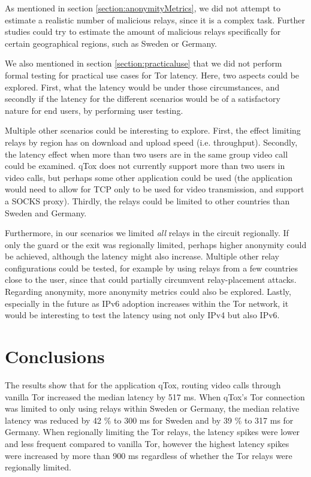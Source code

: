 \documentclass{kththesis}
\begin{document}
As mentioned in section \ref{section:anonymityMetrics}, we did not attempt to estimate a realistic number of malicious relays, since it is a complex task. Further studies could try to estimate the amount of malicious relays specifically for certain geographical regions, such as Sweden or Germany.

We also mentioned in section \ref{section:practicaluse} that we did not perform formal testing for practical use cases for Tor latency. Here, two aspects could be explored. First, what the latency would be under those circumstances, and secondly if the latency for the different scenarios would be of a satisfactory nature for end users, by performing user testing.

Multiple other scenarios could be interesting to explore. First, the effect limiting relays by region has on download and upload speed (i.e. throughput). Secondly, the latency effect when more than two users are in the same group video call could be examined. qTox does not currently support more than two users in video calls, but perhaps some other application could be used (the application would need to allow for TCP only to be used for video transmission, and support a SOCKS proxy). Thirdly, the relays could be limited to other countries than Sweden and Germany.

Furthermore, in our scenarios we limited \emph{all} relays in the circuit regionally. If only the guard or the exit was regionally limited, perhaps higher anonymity could be achieved, although the latency might also increase. Multiple other relay configurations could be tested, for example by using relays from a few countries close to the user, since that could partially circumvent relay-placement attacks. Regarding anonymity, more anonymity metrics could also be explored. Lastly, especially in the future as IPv6 adoption increases within the Tor network, it would be interesting to test the latency using not only IPv4 but also IPv6.

\chapter{Conclusions}
The results show that for the application qTox, routing video calls through vanilla Tor increased the median latency by 517 ms. When qTox's Tor connection was limited to only using relays within Sweden or Germany, the median relative latency was reduced by 42 \% to 300 ms for Sweden and by 39 \% to 317 ms for Germany. When regionally limiting the Tor relays, the latency spikes were lower and less frequent compared to vanilla Tor, however the highest latency spikes were increased by more than 900 ms regardless of whether the Tor relays were regionally limited.
\end{document}
